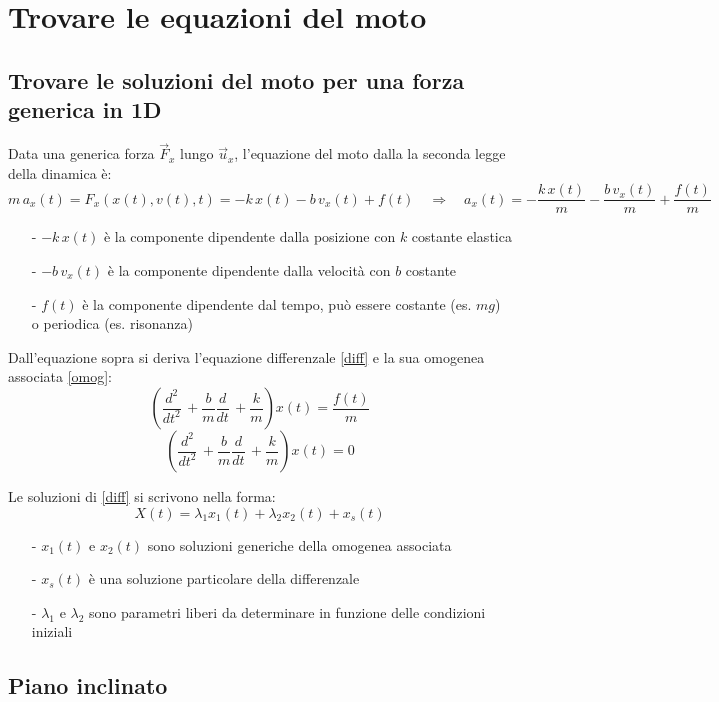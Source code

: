 \documentclass[a4paper]{article}
\newcommand\ux{\vec{u}_x}
\newcommand\dt{\frac{d}{dt}\,}
\newcommand\dts{\frac{d^2}{dt^2}\,}
\begin{document}
\newpage


\section{Trovare le equazioni del moto}
\subsection{Trovare le soluzioni del moto per una forza generica in 1D}
Data una generica forza \(\vec{F}_x\) lungo \(\ux\), l'equazione del moto dalla la seconda legge della dinamica è:
\[m \, a_x(t) = F_x(x(t), v(t), t) = -k \, x(t) - b \, v_x(t) + f(t) \quad \Rightarrow \quad a_x(t) = -\frac{k \, x(t)}{m} - \frac{b \, v_x(t)}{m} + \frac{f(t)}{m}\]
\begin{itemize}[topsep=3pt, itemsep=0pt]
	\item[-] \(-k \, x(t)\) è la componente dipendente dalla posizione con \(k\) costante elastica
	\item[-] \(-b \, v_x(t)\) è la componente dipendente dalla velocità con \(b\) costante
	\item[-] \(f(t)\) è la componente dipendente dal tempo, può essere costante (es. \(mg\)) o periodica (es. risonanza)
\end{itemize}

Dall'equazione sopra si deriva l'equazione differenzale \eqref{diff} e la sua omogenea associata \eqref{omog}:
\begin{equation}
	\label{diff}
	\left(\dts + \frac{b}{m} \dt + \frac{k}{m}\right) x(t) = \frac{f(t)}{m}
\end{equation}
\begin{equation}
	\label{omog}
	\left(\dts + \frac{b}{m} \dt + \frac{k}{m}\right) x(t) = 0
\end{equation}

Le soluzioni di \eqref{diff} si scrivono nella forma:
\[X(t) = \lambda_1 x_1(t) + \lambda_2 x_2(t) + x_s(t)\]
\begin{itemize}[topsep=3pt, itemsep=0pt]
	\item[-] \(x_1(t)\) e \(x_2(t)\) sono soluzioni generiche della omogenea associata
	\item[-] \(x_s(t)\) è una soluzione particolare della differenzale
	\item[-] \(\lambda_1\) e \(\lambda_2\) sono parametri liberi da determinare in funzione delle condizioni iniziali
\end{itemize}

\subsection{Piano inclinato}
\end{document}
